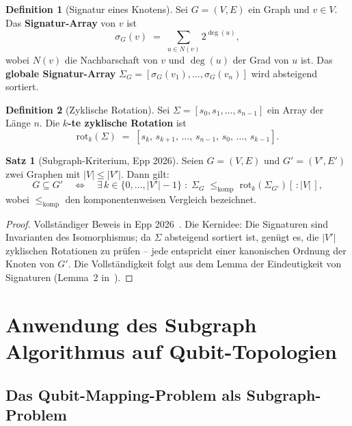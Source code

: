 ﻿\documentclass[a4paper,12pt]{article}
\theoremstyle{definition}
\newtheorem{definition}{Definition}
\newtheorem{satz}{Satz}
\begin{document}
\begin{definition}[Signatur eines Knotens]
\label{def:signature}
Sei $G = (V, E)$ ein Graph und $v \in V$. Das \textbf{Signatur-Array} von $v$ ist
\[
  \sigma_G(v) \;=\; \sum_{u \in N(v)} 2^{\deg(u)},
\]
wobei $N(v)$ die Nachbarschaft von $v$ und $\deg(u)$ der Grad von $u$ ist. Das
\textbf{globale Signatur-Array} $\Sigma_G = [\sigma_G(v_1),\ldots,\sigma_G(v_n)]$
wird absteigend sortiert.
\end{definition}

\begin{definition}[Zyklische Rotation]
\label{def:rotation}
Sei $\Sigma = [s_0, s_1, \ldots, s_{n-1}]$ ein Array der Länge $n$. Die
\textbf{$k$-te zyklische Rotation} ist
\[
  \mathrm{rot}_k(\Sigma) \;=\; [s_k,\, s_{k+1},\, \ldots,\, s_{n-1},\, s_0,\,
  \ldots,\, s_{k-1}].
\]
\end{definition}

\begin{satz}[Subgraph-Kriterium, Epp 2026]
\label{satz:subgraph_kriterium}
Seien $G = (V,E)$ und $G' = (V',E')$ zwei Graphen mit $|V| \leq |V'|$. Dann gilt:
\[
  G \subseteq G' \quad\Longleftrightarrow\quad
  \exists\, k \in \{0,\ldots,|V'|-1\} \;:\;
  \Sigma_G \;\leq_\text{komp}\; \mathrm{rot}_k(\Sigma_{G'})[\,:\!|V|\,],
\]
wobei $\leq_\text{komp}$ den komponentenweisen Vergleich bezeichnet.
\end{satz}

\begin{proof}
Vollständiger Beweis in Epp 2026~\cite{epp2026subgraph}. Die Kernidee: Die
Signaturen sind Invarianten des Isomorphismus; da $\Sigma$ absteigend sortiert ist,
genügt es, die $|V'|$ zyklischen Rotationen zu prüfen -- jede entspricht einer
kanonischen Ordnung der Knoten von $G'$. Die Vollständigkeit folgt aus dem Lemma der
Eindeutigkeit von Signaturen (Lemma~2 in~\cite{epp2026subgraph}).
\end{proof}

\section{Anwendung des Subgraph Algorithmus auf Qubit-Topologien}
\label{sec:mapping}

\subsection{Das Qubit-Mapping-Problem als Subgraph-Problem}
\end{document}
